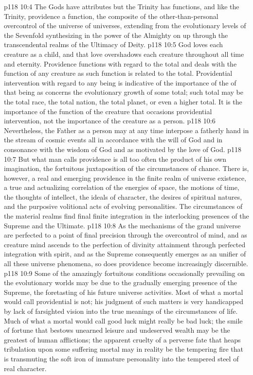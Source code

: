 \vs p118 10:4 The Gods have attributes but the Trinity has functions, and like the Trinity, providence  a function, the composite of the other\hyp{}than\hyp{}personal overcontrol of the universe of universes, extending from the evolutionary levels of the Sevenfold synthesizing in the power of the Almighty on up through the transcendental realms of the Ultimacy of Deity.
\vs p118 10:5 \pc God loves each creature as a child, and that love overshadows each creature throughout all time and eternity. Providence functions with regard to the total and deals with the function of any creature as such function is related to the total. Providential intervention with regard to any being is indicative of the importance of the  of that being as concerns the evolutionary growth of some total; such total may be the total race, the total nation, the total planet, or even a higher total. It is the importance of the function of the creature that occasions providential intervention, not the importance of the creature as a person.
\vs p118 10:6 Nevertheless, the Father as a person may at any time interpose a fatherly hand in the stream of cosmic events all in accordance with the will of God and in consonance with the wisdom of God and as motivated by the love of God.
\vs p118 10:7 But what man calls providence is all too often the product of his own imagination, the fortuitous juxtaposition of the circumstances of chance. There is, however, a real and emerging providence in the finite realm of universe existence, a true and actualizing correlation of the energies of space, the motions of time, the thoughts of intellect, the ideals of character, the desires of spiritual natures, and the purposive volitional acts of evolving personalities. The circumstances of the material realms find final finite integration in the interlocking presences of the Supreme and the Ultimate.
\vs p118 10:8 As the mechanisms of the grand universe are perfected to a point of final precision through the overcontrol of mind, and as creature mind ascends to the perfection of divinity attainment through perfected integration with spirit, and as the Supreme consequently emerges as an  unifier of all these universe phenomena, so does providence become increasingly discernible.
\vs p118 10:9 Some of the amazingly fortuitous conditions occasionally prevailing on the evolutionary worlds may be due to the gradually emerging presence of the Supreme, the foretasting of his future universe activities. Most of what a mortal would call providential is not; his judgment of such matters is very handicapped by lack of farsighted vision into the true meanings of the circumstances of life. Much of what a mortal would call good luck might really be bad luck; the smile of fortune that bestows unearned leisure and undeserved wealth may be the greatest of human afflictions; the apparent cruelty of a perverse fate that heaps tribulation upon some suffering mortal may in reality be the tempering fire that is transmuting the soft iron of immature personality into the tempered steel of real character.
